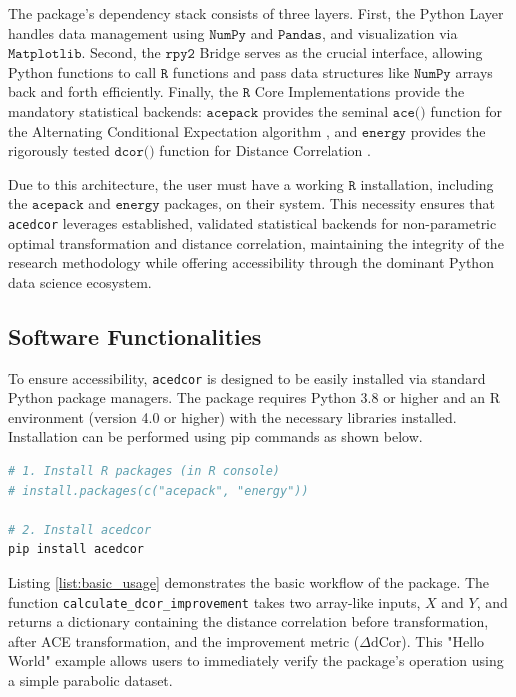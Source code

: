 \documentclass[a4paper,fleqn]{cas-sc}
\newcommand{\dCor}{\mathrm{dCor}}
\begin{document}
The package's dependency stack consists of three layers. First, the Python Layer handles data management using $\texttt{NumPy}$ and $\texttt{Pandas}$, and visualization via $\texttt{Matplotlib}$. Second, the $\texttt{rpy2}$ Bridge serves as the crucial interface, allowing Python functions to call $\texttt{R}$ functions and pass data structures like $\texttt{NumPy}$ arrays back and forth efficiently. Finally, the $\texttt{R}$ Core Implementations provide the mandatory statistical backends: $\texttt{acepack}$ provides the seminal $\texttt{ace()}$ function for the Alternating Conditional Expectation algorithm \citep{BreimanFriedman1985}, and $\texttt{energy}$ provides the rigorously tested $\texttt{dcor()}$ function for Distance Correlation \citep{Szekely2007}.

Due to this architecture, the user must have a working $\texttt{R}$ installation, including the $\texttt{acepack}$ and $\texttt{energy}$ packages, on their system. This necessity ensures that \texttt{acedcor} leverages established, validated statistical backends for non-parametric optimal transformation and distance correlation, maintaining the integrity of the research methodology while offering accessibility through the dominant Python data science ecosystem.

\subsection{Software Functionalities}
To ensure accessibility, \texttt{acedcor} is designed to be easily installed via standard Python package managers. The package requires Python 3.8 or higher and an R environment (version 4.0 or higher) with the necessary libraries installed. Installation can be performed using pip commands as shown below.

\begin{lstlisting}[language=bash]
# 1. Install R packages (in R console)
# install.packages(c("acepack", "energy"))

# 2. Install acedcor
pip install acedcor
\end{lstlisting}

Listing \ref{list:basic_usage} demonstrates the basic workflow of the package. The function \texttt{calculate\_dcor\_improvement} takes two array-like inputs, $X$ and $Y$, and returns a dictionary containing the distance correlation before transformation, after ACE transformation, and the improvement metric ($\Delta\dCor$). This "Hello World" example allows users to immediately verify the package's operation using a simple parabolic dataset.
\end{document}
